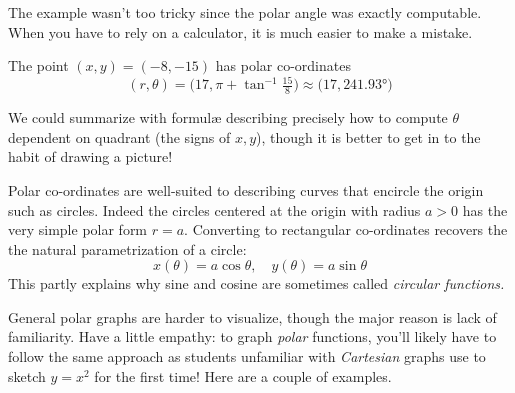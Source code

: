 The example wasn't too tricky since the polar angle was exactly computable. When you have to rely on a calculator, it is much easier to make a mistake.

\begin{example}{}{}
The point $(x,y)=(-8,-15)$ has polar co-ordinates
\[(r,\theta)=\bigl(17,\pi+\tan^{-1}\tfrac{15}8\bigr)\approx \bigl(17,\ang{241.93}\bigr)\]
\end{example}


We could summarize with formulæ describing precisely how to compute $\theta$ dependent on quadrant (the signs of $x,y$), though it is better to get in to the habit of drawing a picture!



Polar co-ordinates are well-suited to describing curves that encircle the origin such as circles. Indeed the circles centered at the origin with radius $a>0$ has the very simple polar form $r=a$. Converting to rectangular co-ordinates recovers the the natural parametrization of a circle:
\[x(\theta)=a\cos\theta,\quad y(\theta)=a\sin\theta\]
This partly explains why sine and cosine are sometimes called \emph{circular functions.}\smallbreak

General polar graphs are harder to visualize, though the major reason is lack of familiarity. Have a little empathy: to graph \emph{polar} functions, you'll likely have to follow the same approach as students unfamiliar with \emph{Cartesian} graphs use to sketch $y=x^2$ for the first time! Here are a couple of examples.


